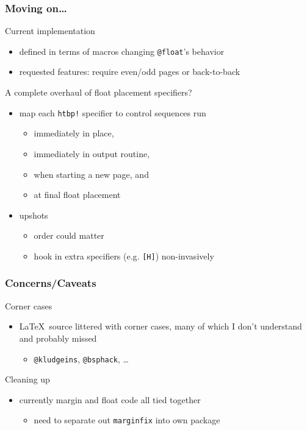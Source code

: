 \documentclass{beamer}
\def\cs#1{\texttt{\expandafter\string\csname#1\endcsname}}
\begin{document}
\begin{frame}
  \frametitle{Moving on\ldots}
  \begin{block}{Current implementation}
    \begin{itemize}
    \item defined in terms of macros changing \cs{@float}'s behavior
    \item requested features: require even/odd pages or back-to-back
    \end{itemize}
  \end{block}
  \begin{block}{A complete overhaul of float placement specifiers?}
    \begin{itemize}
    \item map each \texttt{htbp!} specifier to control sequences run
      \begin{itemize}
      \item immediately in place,
      \item immediately in output routine,
      \item when starting a new page, and
      \item at final float placement
      \end{itemize}
    \item upshots
      \begin{itemize}
      \item order could matter
      \item hook in extra specifiers (e.g. \texttt{[H]}) non-invasively
      \end{itemize}
    \end{itemize}
  \end{block}
\end{frame}

\begin{frame}
  \frametitle{Concerns/Caveats}
  \begin{block}{Corner cases}
    \begin{itemize}
    \item \LaTeX\ source littered with corner cases, many of which
      I don't understand and probably missed 
      \begin{itemize}
      \item \cs{@kludgeins}, \cs{@bsphack}, \ldots
      \end{itemize}
    \end{itemize}
  \end{block}
  \begin{block}{Cleaning up}
    \begin{itemize}
    \item currently margin and float code all tied together
      \begin{itemize}
      \item need to separate out \texttt{marginfix} into own package
      \end{itemize}
    \end{itemize}
  \end{block}
\end{frame}
\end{document}
